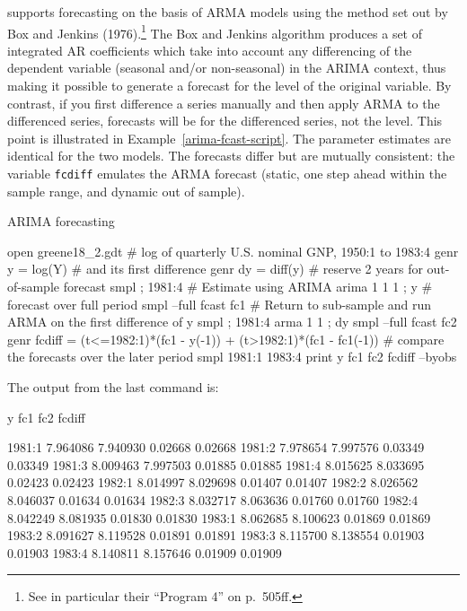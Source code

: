  supports forecasting on the basis of ARMA models using the
method set out by Box and Jenkins (1976).\footnote{See in particular
  their ``Program 4'' on p.\ 505ff.}  The Box and Jenkins algorithm
produces a set of integrated AR coefficients which take into account
any differencing of the dependent variable (seasonal and/or
non-seasonal) in the ARIMA context, thus making it possible to
generate a forecast for the level of the original variable.  By
contrast, if you first difference a series manually and then apply
ARMA to the differenced series, forecasts will be for the differenced
series, not the level.  This point is illustrated
in Example~\ref{arima-fcast-script}.  The parameter estimates are identical
for the two models.  The forecasts differ but are mutually consistent:
the variable \texttt{fcdiff} emulates the ARMA forecast (static,
one step ahead within the sample range, and dynamic out of sample).

\begin{script}[htbp]
  \caption{ARIMA forecasting}
  \label{arima-fcast-script}
\begin{code}
  open greene18_2.gdt
  # log of quarterly U.S. nominal GNP, 1950:1 to 1983:4
  genr y = log(Y)
  # and its first difference
  genr dy = diff(y)
  # reserve 2 years for out-of-sample forecast
  smpl ; 1981:4
  # Estimate using ARIMA
  arima 1 1 1 ; y 
  # forecast over full period
  smpl --full
  fcast fc1
  # Return to sub-sample and run ARMA on the first difference of y
  smpl ; 1981:4
  arma 1 1 ; dy
  smpl --full
  fcast fc2
  genr fcdiff = (t<=1982:1)*(fc1 - y(-1)) + (t>1982:1)*(fc1 - fc1(-1))
  # compare the forecasts over the later period
  smpl 1981:1 1983:4
  print y fc1 fc2 fcdiff --byobs
\end{code}
The output from the last command is:
\begin{code}
                    y          fc1          fc2       fcdiff

  1981:1      7.964086     7.940930      0.02668      0.02668
  1981:2      7.978654     7.997576      0.03349      0.03349
  1981:3      8.009463     7.997503      0.01885      0.01885
  1981:4      8.015625     8.033695      0.02423      0.02423
  1982:1      8.014997     8.029698      0.01407      0.01407
  1982:2      8.026562     8.046037      0.01634      0.01634
  1982:3      8.032717     8.063636      0.01760      0.01760
  1982:4      8.042249     8.081935      0.01830      0.01830
  1983:1      8.062685     8.100623      0.01869      0.01869
  1983:2      8.091627     8.119528      0.01891      0.01891
  1983:3      8.115700     8.138554      0.01903      0.01903
  1983:4      8.140811     8.157646      0.01909      0.01909
\end{code}
\end{script}


